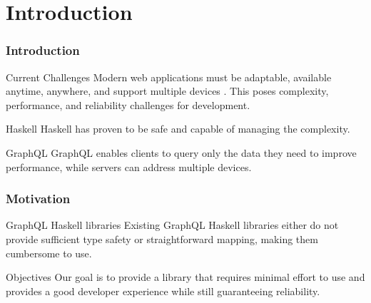 \section{Introduction}

\begin{frame}\frametitle{Introduction}

    \begin{block}{Current Challenges}
        Modern web applications must be adaptable, available anytime, anywhere, and support multiple devices \cite{char-of-modern-web-app}. This poses complexity, performance, and reliability challenges for development.  
    \end{block}

    \begin{block}{Haskell} Haskell has proven to be safe and capable of managing the complexity. 
    \end{block}

    \begin{block}{GraphQL} GraphQL enables clients to query only the data they need to improve performance, while servers can address multiple devices.
    \end{block}

\end{frame}

\begin{frame}\frametitle{Motivation}

\begin{block}{GraphQL Haskell libraries}
    Existing GraphQL Haskell libraries either do not provide sufficient type safety or straightforward mapping, making them cumbersome to use.
\end{block}

\begin{block}{Objectives}
Our goal is to provide a library that requires minimal effort to use and provides a good developer experience while still guaranteeing reliability.
\end{block}

\end{frame}